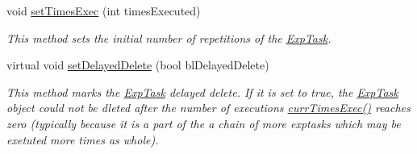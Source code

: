 \begin{DoxyCompactItemize}
void \hyperlink{class_exp_task_a9de0c990109370dea83ca471a05e1772}{set\+Times\+Exec} (int times\+Executed)
\begin{DoxyCompactList}\small\item\em This method sets the initial number of repetitions of the \hyperlink{class_exp_task}{Exp\+Task}. \end{DoxyCompactList}\item 
virtual void \hyperlink{class_exp_task_a2049ca37582a4b3250f3fc46ba19fe2a}{set\+Delayed\+Delete} (bool bl\+Delayed\+Delete)
\begin{DoxyCompactList}\small\item\em This method marks the \hyperlink{class_exp_task}{Exp\+Task} delayed delete. If it is set to true, the \hyperlink{class_exp_task}{Exp\+Task} object could not be dleted after the number of executions \hyperlink{class_exp_task_a1ab988b6d9eb6d61cd1b3ac1a1c42153}{curr\+Times\+Exec()} reaches zero (typically because it is a part of the a chain of more exptasks which may be exetuted more times as whole). \end{DoxyCompactList}\end{DoxyCompactItemize}
